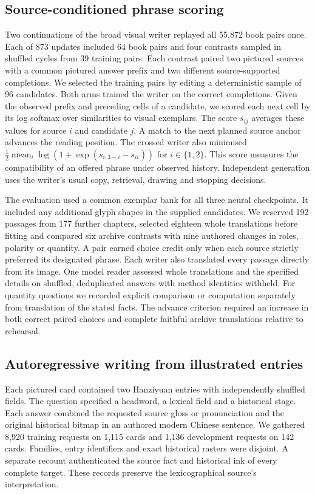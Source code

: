 \documentclass[12pt,a4paper]{article}
\providecommand{\DIFadd}[1]{{\protect\color{blue} \sf #1}} %
\begin{document}
\subsection*{\DIFadd{Source-conditioned phrase scoring}}
\DIFadd{Two continuations of the broad visual writer replayed all 55,872 book pairs once. Each of 873 updates included 64 book pairs and four contrasts sampled in shuffled cycles from 39 training pairs. Each contrast paired two pictured sources with a common pictured answer prefix and two different source-supported completions. We selected the training pairs by editing a deterministic sample of 96 candidates. Both arms trained the writer on the correct completions. Given the observed prefix and preceding cells of a candidate, we scored each next cell by its log softmax over similarities to visual exemplars. The score $s_{ij}$ averages these values for source $i$ and candidate $j$. A match to the next planned source anchor advances the reading position. The crossed writer also minimised $\tfrac{1}{2}\operatorname{mean}_i\log(1+\exp(s_{i,3-i}-s_{ii}))$ for $i\in\{1,2\}$. This score measures the compatibility of an offered phrase under observed history. Independent generation uses the writer's usual copy, retrieval, drawing and stopping decisions.
}

\DIFadd{The evaluation used a common exemplar bank for all three neural checkpoints. It included any additional glyph shapes in the supplied candidates. We reserved 192 passages from 177 further chapters, selected eighteen whole translations before fitting and compared six archive contrasts with nine authored changes in roles, polarity or quantity. A pair earned choice credit only when each source strictly preferred its designated phrase. Each writer also translated every passage directly from its image. One model reader assessed whole translations and the specified details on shuffled, deduplicated answers with method identities withheld. For quantity questions we recorded explicit comparison or computation separately from translation of the stated facts. The advance criterion required an increase in both correct paired choices and complete faithful archive translations relative to rehearsal.
}

\subsection*{\DIFadd{Autoregressive writing from illustrated entries}}
\DIFadd{Each pictured card contained two Hanziyuan entries with independently shuffled fields. The question specified a headword, a lexical field and a historical stage. Each answer combined the requested source gloss or pronunciation and the original historical bitmap in an authored modern Chinese sentence. We gathered 8,920 training requests on 1,115 cards and 1,136 development requests on 142 cards. Families, entry identifiers and exact historical rasters were disjoint. A separate recount authenticated the source fact and historical ink of every complete target. These records preserve the lexicographical source's interpretation.
}
\end{document}
